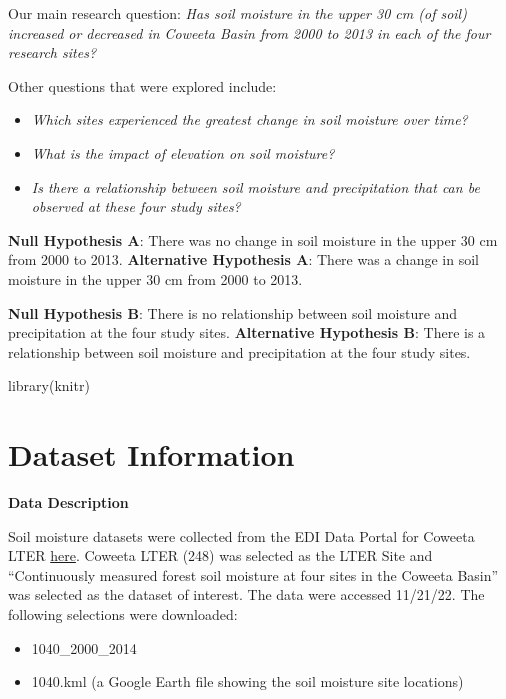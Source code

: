 \documentclass[
  12pt,
]{article}
\newenvironment{Shaded}{\begin{snugshade}}{\end{snugshade}}
\newcommand{\FunctionTok}[1]{\textcolor[rgb]{0.00,0.00,0.00}{#1}}
\newcommand{\NormalTok}[1]{#1}
\providecommand{\tightlist}{%
  \setlength{\itemsep}{0pt}\setlength{\parskip}{0pt}}
\begin{document}
Our main research question: \emph{Has soil moisture in the upper 30 cm
(of soil) increased or decreased in Coweeta Basin from 2000 to 2013 in
each of the four research sites?}

Other questions that were explored include:

\begin{itemize}
\tightlist
\item
  \emph{Which sites experienced the greatest change in soil moisture
  over time?}
\item
  \emph{What is the impact of elevation on soil moisture?}
\item
  \emph{Is there a relationship between soil moisture and precipitation
  that can be observed at these four study sites?}
\end{itemize}

\textbf{Null Hypothesis A}: There was no change in soil moisture in the
upper 30 cm from 2000 to 2013. \textbf{Alternative Hypothesis A}: There
was a change in soil moisture in the upper 30 cm from 2000 to 2013.

\textbf{Null Hypothesis B}: There is no relationship between soil
moisture and precipitation at the four study sites. \textbf{Alternative
Hypothesis B}: There is a relationship between soil moisture and
precipitation at the four study sites.

\begin{Shaded}
\begin{Highlighting}[]
\FunctionTok{library}\NormalTok{(knitr)}
\end{Highlighting}
\end{Shaded}

\newpage

\hypertarget{dataset-information}{%
\section{Dataset Information}\label{dataset-information}}

\textbf{Data Description}

Soil moisture datasets were collected from the EDI Data Portal for
Coweeta LTER \href{https://portal.edirepository.org/nis/home.jsp}{here}.
Coweeta LTER (248) was selected as the LTER Site and ``Continuously
measured forest soil moisture at four sites in the Coweeta Basin'' was
selected as the dataset of interest. The data were accessed 11/21/22.
The following selections were downloaded:

\begin{itemize}
\tightlist
\item
  1040\_2000\_2014
\item
  1040.kml (a Google Earth file showing the soil moisture site
  locations)
\end{itemize}
\end{document}
